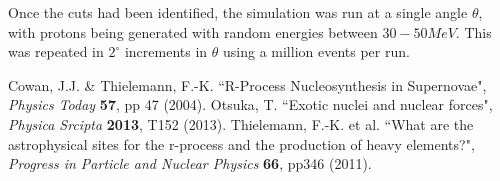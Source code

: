 \documentclass[a4paper,12pt]{article}
\begin{document}
Once the cuts had been identified, the simulation was run at a single angle $\theta$, with protons being generated with random energies between $30-50MeV$. This was repeated in $2^{\circ}$ increments in $\theta$ using a million events per run.


\clearpage
\begin{thebibliography}{99}
 Cowan, J.J. \& Thielemann, F.-K. ``R-Process Nucleosynthesis in Supernovae", \textit{Physics Today} \textbf{57}, pp 47 (2004).
 Otsuka, T. ``Exotic nuclei and nuclear forces", \textit{Physica Srcipta} \textbf{2013}, T152 (2013).
 Thielemann, F.-K. et al. ``What are the astrophysical sites for the r-process and the production of heavy elements?", \textit{Progress in Particle and Nuclear Physics} \textbf{66}, pp346 (2011).


\end{thebibliography}
\end{document}
